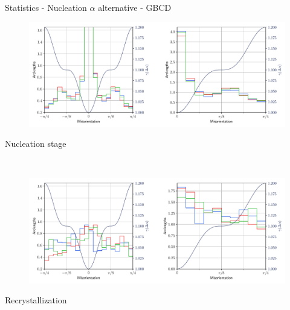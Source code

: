 \documentclass[usenames,dvipsnames]{beamer}
\begin{document}
\begin{frame}{Statistics - Nucleation $\alpha$ alternative - GBCD}
\small
    \begin{minipage}{\textwidth}
    \centering
    \vspace{-0.5em}
    \begin{figure}
    \centering
    \includegraphics[scale=0.33]{figures/stored_energy/SE/gbcd/000110_nuclalternative_set.pdf}
    \end{figure}
    \vspace{-2em}
    Nucleation stage
    \end{minipage}\\
    \begin{minipage}{\textwidth}
    \centering
    \begin{figure}
    \centering
    \includegraphics[scale=0.33]{figures/stored_energy/SE/gbcd/000240_nuclalternative_set.pdf}
    \end{figure}
    \vspace{-2em}
    Recrystallization
    \end{minipage}
\end{frame}
\end{document}
